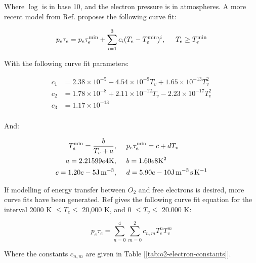 \documentclass[10pt]{article}
\begin{document}
\begin{flushleft}
Where $\log$ is in base 10, and the electron pressure is in atmospheres. A more recent model from Ref. \cite{laporta2013} proposes the following curve fit:

\begin{equation*}
    p_e \tau_e = p_e \tau_e^\text{min} + \sum_{i=1}^3 c_i (T_e - T_e^\text{min})^i, \hspace{5mm} T_e \geq T_e^\text{min}
\end{equation*}

With the following curve fit parameters:

\begin{align*}
    c_1 &= 2.38 \times 10^{-5} - 4.54 \times 10^{-9} T_v + 1.65 \times 10^{-13} T_v^2 \\
    c_2 &= 1.78 \times 10^{-8} + 2.11 \times 10^{-12} T_v - 2.23 \times 10^{-17} T_v^2 \\
    c_3 &= 1.17 \times 10^{-13} \\
\end{align*}

And:

\begin{align*}
    T_e^\text{min} = \frac{b}{T_v + a}, &\hspace{5mm} p_e \tau_e^ \text{min} = c + d T_v \\
    a = 2.21599e4 \si{\kelvin}, &\hspace{5mm} b = 1.60e8 \si{\kelvin\squared} \\
    c = 1.20e-5\si{\joule\per\meter\tothe{3}}, &\hspace{5mm} d = 5.90e-10 \si{\joule\per\meter\tothe{3}\second\per\kelvin}
\end{align*}

If modelling of energy transfer between $O_2$ and free electrons is desired, more curve fits have been generated. Ref \cite{laporta2016} gives the following curve fit equation for the interval 2000 K $\leq T_e \leq$ 20,000 K, and 0 $\leq T_v \leq$ 20.000 K:

\begin{equation}
    p_e \tau_e = \sum_{n=0}^4 \sum_{m=0}^2 c_{n,m} T_e^n T_v^m
\end{equation}

Where the constants $c_{n,m}$ are given in Table [\ref{tab:o2-electron-constants}].


\end{flushleft}
\end{document}
